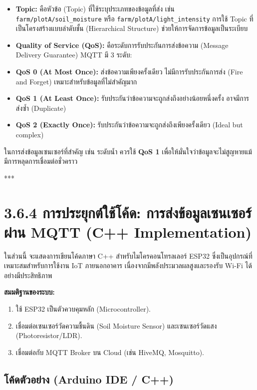 \documentclass[11pt,a4paper,openany]{report}
\begin{document}
\begin{itemize}
  \item \textbf{Topic:} คือหัวข้อ (Topic) ที่ใช้ระบุประเภทของข้อมูลที่ส่ง เช่น \texttt{farm/plotA/soil\_moisture} หรือ \texttt{farm/plotA/light\_intensity} การใช้ Topic ที่เป็นโครงสร้างแบบลำดับชั้น (Hierarchical Structure) ช่วยให้การจัดการข้อมูลเป็นระเบียบ
  \item \textbf{Quality of Service (QoS):} คือระดับการรับประกันการส่งข้อความ (Message Delivery Guarantee) MQTT มี 3 ระดับ:
  \item \textbf{QoS 0 (At Most Once):} ส่งข้อความเพียงครั้งเดียว ไม่มีการรับประกันการส่ง (Fire and Forget) เหมาะสำหรับข้อมูลที่ไม่สำคัญมาก
  \item \textbf{QoS 1 (At Least Once):} รับประกันว่าข้อความจะถูกส่งถึงอย่างน้อยหนึ่งครั้ง อาจมีการส่งซ้ำ (Duplicate)
  \item \textbf{QoS 2 (Exactly Once):} รับประกันว่าข้อความจะถูกส่งถึงเพียงครั้งเดียว (Ideal but complex)
\end{itemize}


ในการส่งข้อมูลเซนเซอร์ที่สำคัญ เช่น ระดับน้ำ ควรใช้ \textbf{QoS 1} เพื่อให้มั่นใจว่าข้อมูลจะไม่สูญหายแม้มีการหลุดการเชื่อมต่อชั่วคราว

***

\section{3.6.4 การประยุกต์ใช้โค้ด: การส่งข้อมูลเซนเซอร์ผ่าน MQTT (C++ Implementation)}


ในส่วนนี้ จะแสดงการเขียนโค้ดภาษา C++ สำหรับไมโครคอนโทรลเลอร์ ESP32 ซึ่งเป็นอุปกรณ์ที่เหมาะสมสำหรับการใช้งาน IoT ภายนอกอาคาร เนื่องจากมีพลังประมวลผลสูงและรองรับ Wi-Fi ได้อย่างมีประสิทธิภาพ

\textbf{สมมติฐานของระบบ:}
\begin{enumerate}
  \item ใช้ ESP32 เป็นตัวควบคุมหลัก (Microcontroller).
  \item เชื่อมต่อเซนเซอร์วัดความชื้นดิน (Soil Moisture Sensor) และเซนเซอร์วัดแสง (Photoresistor/LDR).
  \item เชื่อมต่อกับ MQTT Broker บน Cloud (เช่น HiveMQ, Mosquitto).
\end{enumerate}


\subsection{โค้ดตัวอย่าง (Arduino IDE / C++)}
\end{document}
